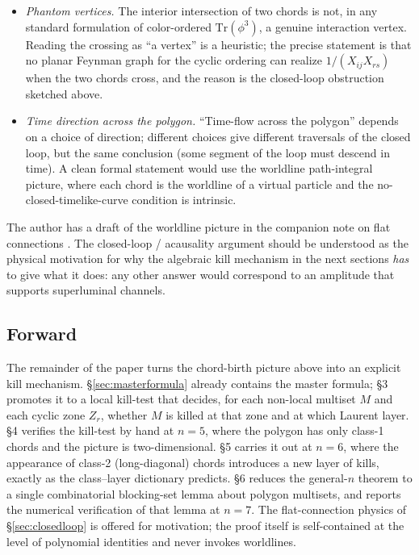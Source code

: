 \documentclass[11pt]{article}
\theoremstyle{definition}
\newcommand{\Tr}{\mathrm{Tr}}
\begin{document}
\begin{itemize}
  \item \emph{Phantom vertices.} The interior intersection of two chords is not, in any standard formulation of color-ordered $\Tr(\phi^3)$, a genuine interaction vertex. Reading the crossing as ``a vertex'' is a heuristic; the precise statement is that no planar Feynman graph for the cyclic ordering can realize $1/(X_{ij}X_{rs})$ when the two chords cross, and the reason is the closed-loop obstruction sketched above.
  \item \emph{Time direction across the polygon.} ``Time-flow across the polygon'' depends on a choice of direction; different choices give different traversals of the closed loop, but the same conclusion (some segment of the loop must descend in time). A clean formal statement would use the worldline path-integral picture, where each chord is the worldline of a virtual particle and the no-closed-timelike-curve condition is intrinsic.
\end{itemize}

\noindent
The author has a draft of the worldline picture in the companion note on flat connections \cite{flatconn}. The closed-loop / acausality argument should be understood as the physical motivation for why the algebraic kill mechanism in the next sections \emph{has} to give what it does: any other answer would correspond to an amplitude that supports superluminal channels.

\subsection*{Forward}

The remainder of the paper turns the chord-birth picture above into an explicit kill mechanism. \S\ref{sec:masterformula} already contains the master formula; \S3 promotes it to a local kill-test that decides, for each non-local multiset $M$ and each cyclic zone $Z_r$, whether $M$ is killed at that zone and at which Laurent layer. \S4 verifies the kill-test by hand at $n=5$, where the polygon has only class-1 chords and the picture is two-dimensional. \S5 carries it out at $n=6$, where the appearance of class-2 (long-diagonal) chords introduces a new layer of kills, exactly as the class--layer dictionary predicts. \S6 reduces the general-$n$ theorem to a single combinatorial blocking-set lemma about polygon multisets, and reports the numerical verification of that lemma at $n = 7$. The flat-connection physics of \S\ref{sec:closedloop} is offered for motivation; the proof itself is self-contained at the level of polynomial identities and never invokes worldlines.
\end{document}

